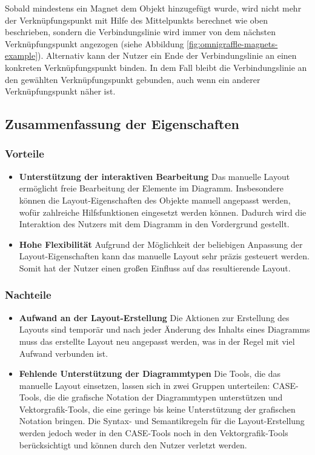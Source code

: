 Sobald mindestens ein Magnet dem Objekt hinzugefügt wurde, wird nicht mehr der Verknüpfungspunkt mit Hilfe des Mittelpunkts berechnet wie oben beschrieben, sondern die Verbindungslinie wird immer von dem nächsten Verknüpfungspunkt angezogen (siehe Abbildung \ref{fig:omnigraffle-magnets-example}). Alternativ kann der Nutzer ein Ende der Verbindungslinie an einen konkreten Verknüpfungspunkt binden. In dem Fall bleibt die Verbindungslinie an den gewählten Verknüpfungspunkt gebunden, auch wenn ein anderer Verknüpfungspunkt näher ist.

\subsection{Zusammenfassung der Eigenschaften}
\label{subsec:summary-manual-layout}

\subsubsection{Vorteile}

\begin{itemize}

\item
\textbf{Unterstützung der interaktiven Bearbeitung}
Das manuelle Layout ermöglicht freie Bearbeitung der Elemente im Diagramm. Insbesondere können die Layout-Eigenschaften des Objekte manuell angepasst werden, wofür zahlreiche Hilfsfunktionen eingesetzt werden können. Dadurch wird die Interaktion des Nutzers mit dem Diagramm in den Vordergrund gestellt.

\item
\textbf{Hohe Flexibilität}
Aufgrund der Möglichkeit der beliebigen Anpassung der Layout-Ei\-gen\-schaften kann das manuelle Layout sehr präzis gesteuert werden. Somit hat der Nutzer einen großen Einfluss auf das resultierende Layout.

\end{itemize}

\subsubsection{Nachteile}

\begin{itemize}

\item
\textbf{Aufwand an der Layout-Erstellung}
Die Aktionen zur Erstellung des Layouts sind temporär und nach jeder Änderung des Inhalts eines Diagramms muss das erstellte Layout neu angepasst werden, was in der Regel mit viel Aufwand verbunden ist.

\item
\textbf{Fehlende Unterstützung der Diagrammtypen}
Die Tools, die das manuelle Layout einsetzen, lassen sich in zwei Gruppen unterteilen: CASE-Tools, die die grafische Notation der Diagrammtypen unterstützen und Vektorgrafik-Tools, die eine geringe bis keine Unterstützung der grafischen Notation bringen. Die Syntax- und Semantikregeln für die Layout-Erstellung werden jedoch weder in den CASE-Tools noch in den Vektorgrafik-Tools berücksichtigt und können durch den Nutzer verletzt werden.

\end{itemize}

